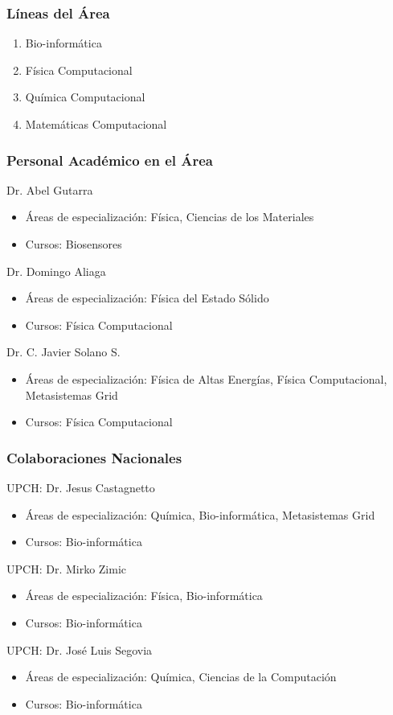 \subsubsection{L\'ineas del \'Area}

\begin{enumerate}
\item Bio-inform\'atica
\item F\'isica Computacional
\item Qu\'imica Computacional
\item Matem\'aticas Computacional
\end{enumerate}

\subsubsection{Personal Acad\'emico en el \'Area}

Dr. Abel Gutarra
\begin{itemize}
\item \'Areas de especializaci\'on: F\'isica, Ciencias de los Materiales
\item Cursos: Biosensores
\end{itemize}

Dr. Domingo Aliaga
\begin{itemize}
\item \'Areas de especializaci\'on: F\'isica del Estado S\'olido
\item Cursos: F\'isica Computacional
\end{itemize}

Dr. C. Javier Solano S.
\begin{itemize}
\item \'Areas de especializaci\'on: F\'isica de Altas Energ\'ias, F\'isica Computacional, Metasistemas Grid
\item Cursos: F\'isica Computacional
\end{itemize}

\subsubsection{Colaboraciones Nacionales}

UPCH: Dr. Jesus Castagnetto
\begin{itemize}
\item \'Areas de especializaci\'on: Qu\'imica, Bio-inform\'atica, Metasistemas Grid
\item Cursos: Bio-inform\'atica
\end{itemize}

UPCH: Dr. Mirko Zimic
\begin{itemize}
\item \'Areas de especializaci\'on: F\'isica, Bio-inform\'atica
\item Cursos: Bio-inform\'atica
\end{itemize}

UPCH: Dr. Jos\'e Luis Segovia
\begin{itemize}
\item \'Areas de especializaci\'on: Qu\'imica, Ciencias de la Computaci\'on
\item Cursos: Bio-inform\'atica
\end{itemize}

